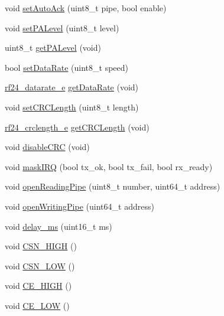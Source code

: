 \begin{DoxyCompactItemize}
\item 
void \hyperlink{classNRF24L01_a79cab6f958c8d9e18273d7c4750480fd}{set\+Auto\+Ack} (uint8\+\_\+t pipe, bool enable)
\item 
void \hyperlink{classNRF24L01_a7319961d6048e32546ad5df934bd42d8}{set\+P\+A\+Level} (uint8\+\_\+t level)
\item 
uint8\+\_\+t \hyperlink{classNRF24L01_a8fdb80b79100186afad90d9a2a5c79fb}{get\+P\+A\+Level} (void)
\item 
bool \hyperlink{classNRF24L01_a9db0803c6d87e6ada7febea2240a7b1c}{set\+Data\+Rate} (uint8\+\_\+t speed)
\item 
\hyperlink{NRF24L01_8h_a82745de4aa1251b7561564b3ed1d6522}{rf24\+\_\+datarate\+\_\+e} \hyperlink{classNRF24L01_a6184de85c94400cde96b7f83b316efa8}{get\+Data\+Rate} (void)
\item 
void \hyperlink{classNRF24L01_a6081dd6dd9cdffbc1c7534ee1824201d}{set\+C\+R\+C\+Length} (uint8\+\_\+t length)
\item 
\hyperlink{NRF24L01_8h_adbe00719f3f835c82bd007081d040a7e}{rf24\+\_\+crclength\+\_\+e} \hyperlink{classNRF24L01_ac83fb86df156475aeda2ef637078fcd3}{get\+C\+R\+C\+Length} (void)
\item 
void \hyperlink{classNRF24L01_a1e997f3c946acdbe8bd622e431f80034}{disable\+C\+RC} (void)
\item 
void \hyperlink{classNRF24L01_ad23d4111c3a26d18db51eb72a5491dbb}{mask\+I\+RQ} (bool tx\+\_\+ok, bool tx\+\_\+fail, bool rx\+\_\+ready)
\item 
void \hyperlink{classNRF24L01_a02c91592a6c762c1a4e86252f8958bd6}{open\+Reading\+Pipe} (uint8\+\_\+t number, uint64\+\_\+t address)
\item 
void \hyperlink{classNRF24L01_a0fe37f8ff95b7c562ad1fc277890e29a}{open\+Writing\+Pipe} (uint64\+\_\+t address)
\item 
void \hyperlink{classNRF24L01_ad311ef5130c99ab8ddca292adfe76603}{delay\+\_\+ms} (uint16\+\_\+t ms)
\item 
void \hyperlink{classNRF24L01_a958fa3e8a0457c0c655b9652ee9dbad4}{C\+S\+N\+\_\+\+H\+I\+GH} ()
\item 
void \hyperlink{classNRF24L01_acffaad2c6b5e3713f7fe6af22d4553ef}{C\+S\+N\+\_\+\+L\+OW} ()
\item 
void \hyperlink{classNRF24L01_a85274c10cbe6317796a209913bfb0253}{C\+E\+\_\+\+H\+I\+GH} ()
\item 
void \hyperlink{classNRF24L01_aa5e261363986c590c90e7cb2adc2d75d}{C\+E\+\_\+\+L\+OW} ()
\end{DoxyCompactItemize}



